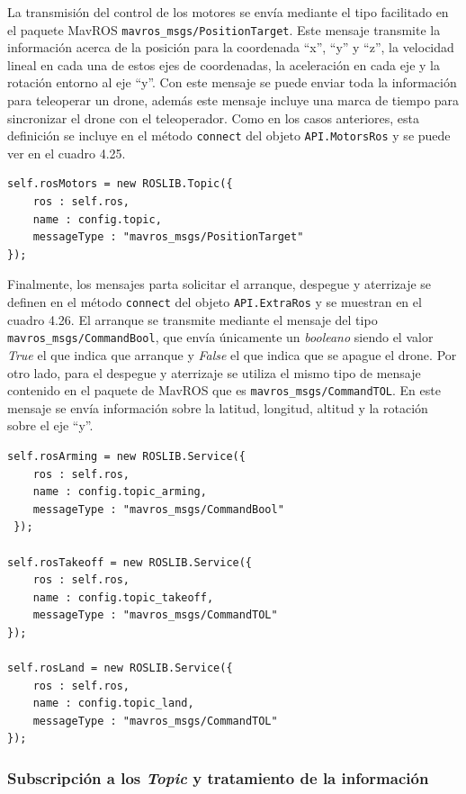 La transmisión del control de los motores se envía mediante el tipo facilitado en el paquete MavROS \texttt{mavros\_msgs/PositionTarget}. Este mensaje transmite la información acerca de la posición para la coordenada ``x'', ``y'' y ``z'', la velocidad lineal en cada una de estos ejes de coordenadas, la aceleración en cada eje y la rotación entorno al eje ``y''. Con este mensaje se puede enviar toda la información para teleoperar un drone, además este mensaje incluye una marca de tiempo para sincronizar el drone con el teleoperador. Como en los casos anteriores, esta definición se incluye en el método \texttt{connect} del objeto \texttt{API.MotorsRos} y se puede ver en el cuadro 4.25.

\begin{lstlisting}[caption= Definición del mensaje para controlar los motores del drone, label=cod.mensajemotordrone]
self.rosMotors = new ROSLIB.Topic({
	ros : self.ros,
	name : config.topic,
	messageType : "mavros_msgs/PositionTarget"
});
\end{lstlisting}

Finalmente, los mensajes parta solicitar el arranque, despegue y aterrizaje se definen en el método \texttt{connect} del objeto \texttt{API.ExtraRos} y se muestran en el cuadro 4.26. El arranque se transmite mediante el mensaje del tipo \texttt{mavros\_msgs/CommandBool}, que envía únicamente un \textit{booleano} siendo el valor \textit{True} el que indica que arranque y \textit{False} el que indica que se apague el drone. Por otro lado, para el despegue y aterrizaje se utiliza el mismo tipo de mensaje contenido en el paquete de MavROS que es \texttt{mavros\_msgs/CommandTOL}. En este mensaje se envía información sobre la latitud, longitud, altitud y la rotación sobre el eje ``y''.

\begin{lstlisting}[caption= {Definición de los mensajes para arrancar, despegar y aterrizar}, label=cod.mensajeextradrone]
self.rosArming = new ROSLIB.Service({
	ros : self.ros,
	name : config.topic_arming,
	messageType : "mavros_msgs/CommandBool"
 });

self.rosTakeoff = new ROSLIB.Service({
	ros : self.ros,
	name : config.topic_takeoff,
	messageType : "mavros_msgs/CommandTOL"
});

self.rosLand = new ROSLIB.Service({
	ros : self.ros,
	name : config.topic_land,
	messageType : "mavros_msgs/CommandTOL"
});
\end{lstlisting}

\subsubsection{Subscripción a los \textit{Topic} y tratamiento de la información}

